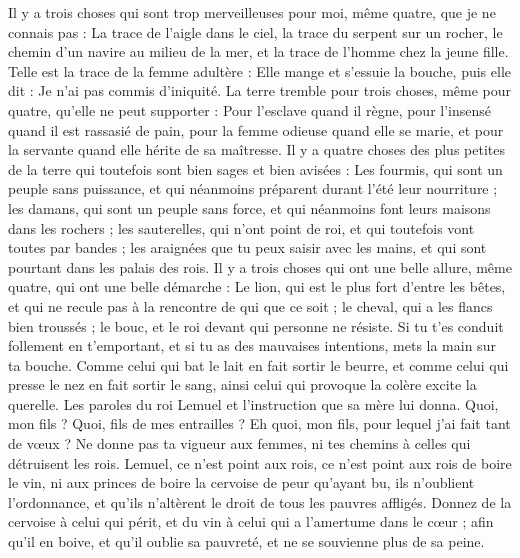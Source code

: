 \begin{multicols}{2}
Il y a trois choses qui sont trop merveilleuses pour moi, même quatre, que je ne connais pas :
La trace de l'aigle dans le ciel, la trace du serpent sur un rocher, le chemin d'un navire au milieu de la mer, et la trace de l'homme chez la jeune fille.
Telle est la trace de la femme adultère : Elle mange et s'essuie la bouche, puis elle dit : Je n'ai pas commis d'iniquité.
La terre tremble pour trois choses, même pour quatre, qu'elle ne peut supporter :
Pour l'esclave quand il règne, pour l'insensé quand il est rassasié de pain,
pour la femme odieuse quand elle se marie, et pour la servante quand elle hérite de sa maîtresse.
Il y a quatre choses des plus petites de la terre qui toutefois sont bien sages et bien avisées :
Les fourmis, qui sont un peuple sans puissance, et qui néanmoins préparent durant l'été leur nourriture ;
les damans, qui sont un peuple sans force, et qui néanmoins font leurs maisons dans les rochers ;
les sauterelles, qui n'ont point de roi, et qui toutefois vont toutes par bandes ;
les araignées que tu peux saisir avec les mains, et qui sont pourtant dans les palais des rois.
Il y a trois choses qui ont une belle allure, même quatre, qui ont une belle démarche :
Le lion, qui est le plus fort d'entre les bêtes, et qui ne recule pas à la rencontre de qui que ce soit ;
le cheval, qui a les flancs bien troussés ; le bouc, et le roi devant qui personne ne résiste.
Si tu t'es conduit follement en t'emportant, et si tu as des mauvaises intentions, mets la main sur ta bouche.
Comme celui qui bat le lait en fait sortir le beurre, et comme celui qui presse le nez en fait sortir le sang, ainsi celui qui provoque la colère excite la querelle.
\VerseOne{}Les paroles du roi Lemuel et l'instruction que sa mère lui donna.
Quoi, mon fils ? Quoi, fils de mes entrailles ? Eh quoi, mon fils, pour lequel j'ai fait tant de vœux ?
Ne donne pas ta vigueur aux femmes, ni tes chemins à celles qui détruisent les rois.
Lemuel, ce n'est point aux rois, ce n'est point aux rois de boire le vin, ni aux princes de boire la cervoise
de peur qu'ayant bu, ils n'oublient l'ordonnance, et qu'ils n'altèrent le droit de tous les pauvres affligés.
Donnez de la cervoise à celui qui périt, et du vin à celui qui a l'amertume dans le cœur ;
afin qu'il en boive, et qu'il oublie sa pauvreté, et ne se souvienne plus de sa peine.

\end{multicols}
